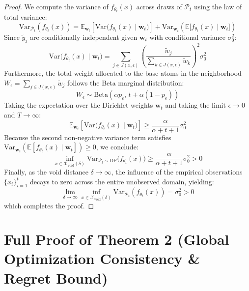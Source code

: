 \documentclass{article}
\begin{document}
\begin{proof}
We compute the variance of $f_{\theta_t}(x)$ across draws of $\mathcal{P}_t$ using the law of total variance:
\begin{equation}
\mathrm{Var}_{\mathcal{P}_t}(f_{\theta_t}(x)) = \mathbb{E}_{\mathbf{w}_t}\left[ \mathrm{Var}\big(f_{\theta_t}(x) \mid \mathbf{w}_t\big) \right] + \mathrm{Var}_{\mathbf{w}_t}\left( \mathbb{E}\big[f_{\theta_t}(x) \mid \mathbf{w}_t\big] \right)
\end{equation}
Since $\tilde{y}_j$ are conditionally independent given $\mathbf{w}_t$ with conditional variance $\sigma_0^2$:
\begin{equation}
\mathrm{Var}\big(f_{\theta_t}(x) \mid \mathbf{w}_t\big) = \sum_{j \in J(x, \epsilon)} \left(\frac{\widetilde{w}_j}{\sum_{k \in J(x, \epsilon)} \widetilde{w}_k}\right)^2 \sigma_0^2
\end{equation}
Furthermore, the total weight allocated to the base atoms in the neighborhood $W_\epsilon = \sum_{j \in J(x, \epsilon)} \widetilde{w}_j$ follows the Beta marginal distribution:
\begin{equation}
W_\epsilon \sim \mathrm{Beta}\left(\alpha p_\epsilon, \, t + \alpha(1 - p_\epsilon)\right)
\end{equation}
Taking the expectation over the Dirichlet weights $\mathbf{w}_t$ and taking the limit $\epsilon \to 0$ and $T \to \infty$:
\begin{equation}
\mathbb{E}_{\mathbf{w}_t}\left[\mathrm{Var}\big(f_{\theta_t}(x) \mid \mathbf{w}_t\big)\right] \ge \frac{\alpha}{\alpha + t + 1} \sigma_0^2
\end{equation}
Because the second non-negative variance term satisfies $\mathrm{Var}_{\mathbf{w}_t}(\mathbb{E}[f_{\theta_t}(x) \mid \mathbf{w}_t]) \ge 0$, we conclude:
\begin{equation}
\inf_{x \in \mathcal{X}_{\mathrm{void}}(\delta)} \mathrm{Var}_{\mathcal{P}_t \sim \mathrm{DP}}\big(f_{\theta_t}(x)\big) \ge \frac{\alpha}{\alpha + t + 1} \sigma_0^2 > 0
\end{equation}
Finally, as the void distance $\delta \to \infty$, the influence of the empirical observations $\{x_i\}_{i=1}^t$ decays to zero across the entire unobserved domain, yielding:
\begin{equation}
\lim_{\delta \to \infty} \inf_{x \in \mathcal{X}_{\mathrm{void}}(\delta)} \mathrm{Var}_{\mathcal{P}_t}(f_{\theta_t}(x)) = \sigma_0^2 > 0
\end{equation}
which completes the proof.
\end{proof}

\section{Full Proof of Theorem 2 (Global Optimization Consistency & Regret Bound)}
\label{app:proof_thm2}
\end{document}
